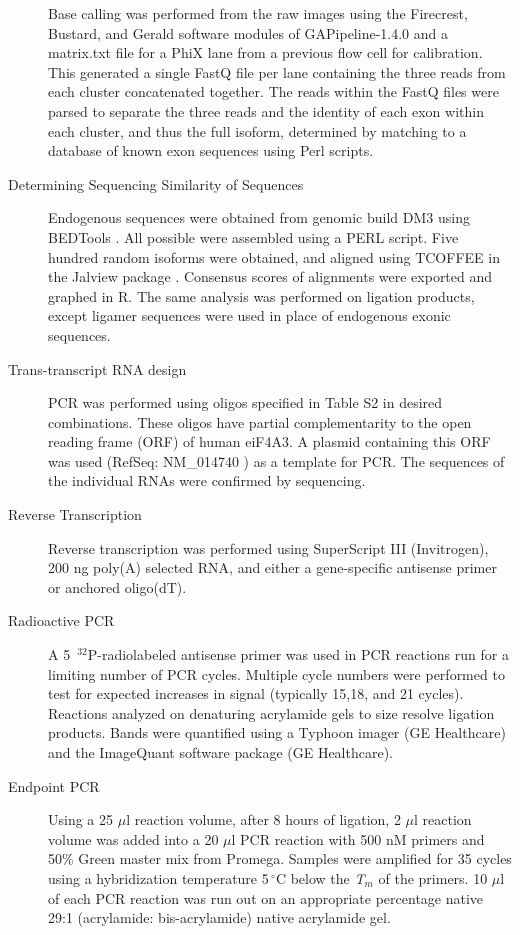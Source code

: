 \begin{description}
		Base calling was performed from the raw images using the Firecrest, Bustard, and Gerald software modules of GAPipeline-1.4.0 and a matrix.txt file for a PhiX lane from a previous flow cell for calibration. This generated a single FastQ file per lane containing the three reads from each cluster concatenated together. The reads within the FastQ files were parsed to separate the three reads and the identity of each exon within each cluster, and thus the full isoform, determined by matching to a database of known exon sequences using Perl scripts.
		
		\item[Determining Sequencing Similarity of \dscam{} Sequences] 
		Endogenous \dscam{} sequences were obtained from genomic build DM3 using BEDTools \citep{Quinlan2010}. All possible \dscam{} were assembled using a PERL script. Five hundred random isoforms were obtained, and aligned using TCOFFEE \citep{Notredame2000} in the Jalview package \citep{Waterhouse2009}. Consensus scores of alignments were exported and graphed in R. The same analysis was performed on \dscam{} ligation products, except ligamer sequences were used in place of endogenous exonic sequences.
		
		\item[Trans-transcript RNA design] 
		PCR was performed using oligos specified in Table S2 in desired combinations. These oligos have partial complementarity to the open reading frame (ORF) of human eiF4A3. A plasmid containing this ORF was used (RefSeq: NM_014740 ) as a template for PCR. The sequences of the individual RNAs were confirmed by sequencing. 

		\item[Reverse Transcription] 
		Reverse transcription was performed using SuperScript III (Invitrogen), 200 ng poly(A) selected RNA, and either a gene-specific antisense primer or anchored oligo(dT).

		\item[Radioactive PCR] 
		A 5\textprime~$^{32}$P-radiolabeled antisense primer was used in PCR reactions run for a limiting number of PCR cycles. Multiple cycle numbers were performed to test for expected increases in signal (typically 15,18, and 21 cycles). Reactions analyzed on denaturing acrylamide gels to size resolve ligation products. Bands were quantified using a Typhoon imager (GE Healthcare) and the ImageQuant software package (GE Healthcare).

		\item[Endpoint PCR] 
		Using a 25 $\mu$l reaction volume, after 8 hours of ligation, 2 $\mu$l reaction volume was added into a 20 $\mu$l PCR reaction with 500 nM primers and 50\% Green master mix from Promega. Samples were amplified for 35 cycles using a hybridization temperature 5$\,^{\circ}\mathrm{C}$ below the \textit{T}$_{m}$ of the primers. 10 $\mu$l of each PCR reaction was run out on an appropriate percentage native 29:1 (acrylamide: bis-acrylamide) native acrylamide gel.


\end{description}
